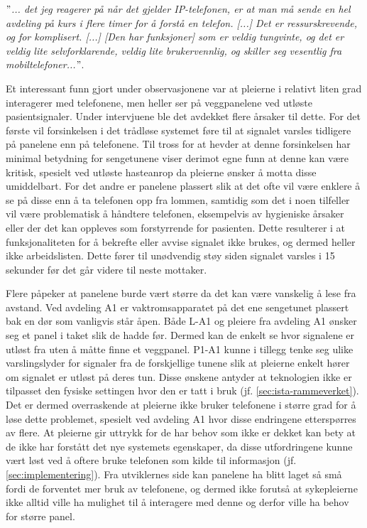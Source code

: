 \noindent
\textit{ $"$... det jeg reagerer på når det gjelder IP-telefonen, er at man må sende en hel avdeling på kurs i flere timer for å forstå en telefon. [...] Det er ressurskrevende, og for komplisert. [...] [Den har funksjoner] som er veldig tungvinte, og det er veldig lite selvforklarende, veldig lite brukervennlig, og skiller seg vesentlig fra mobiltelefoner...$"$}.

\noindent
Et interessant funn gjort under observasjonene var at pleierne i relativt liten grad interagerer med telefonene, men heller ser på veggpanelene ved utløste pasientsignaler. Under intervjuene ble det avdekket flere årsaker til dette. For det første vil forsinkelsen i det trådløse systemet føre til at signalet varsles tidligere på panelene enn på telefonene. Til tross for at \citet{Sletten09} hevder at denne forsinkelsen har minimal betydning for sengetunene viser derimot egne funn at denne kan være kritisk, spesielt ved utløste hasteanrop da pleierne ønsker å motta disse umiddelbart. For det andre er panelene plassert slik at det ofte vil være enklere å se på disse enn å ta telefonen opp fra lommen, samtidig som det i noen tilfeller vil være problematisk å håndtere telefonen, eksempelvis av hygieniske årsaker eller der det kan oppleves som forstyrrende for pasienten. Dette resulterer i at funksjonaliteten for å bekrefte eller avvise signalet ikke brukes, og dermed heller ikke arbeidslisten. Dette fører til unødvendig støy siden signalet varsles i 15 sekunder før det går videre til neste mottaker. 

\noindent
Flere påpeker at panelene burde vært større da det kan være vanskelig å lese fra avstand. Ved avdeling A1 er vaktromsapparatet på det ene sengetunet plassert bak en dør som vanligvis står åpen. Både L-A1 og pleiere fra avdeling A1 ønsker seg et panel i taket slik de hadde før. Dermed kan de enkelt se hvor signalene er utløst fra uten å måtte finne et veggpanel. P1-A1 kunne i tillegg tenke seg ulike varslingslyder for signaler fra de forskjellige tunene slik at pleierne enkelt hører om signalet er utløst på deres tun. Disse ønskene antyder at teknologien ikke er tilpasset den fysiske settingen hvor den er tatt i bruk (jf. \ref{sec:ista-rammeverket}). Det er dermed overraskende at pleierne ikke bruker telefonene i større grad for å løse dette problemet, spesielt ved avdeling A1 hvor disse endringene etterspørres av flere. At pleierne gir uttrykk for de har behov som ikke er dekket kan bety at de ikke har forstått det nye systemets egenskaper, da disse utfordringene kunne vært løst ved å oftere bruke telefonen som kilde til informasjon (jf. \ref{sec:implementering}). Fra utviklernes side kan panelene ha blitt laget så små fordi de forventet mer bruk av telefonene, og dermed ikke forutså at sykepleierne ikke alltid ville ha mulighet til å interagere med denne og derfor ville ha behov for større panel.

